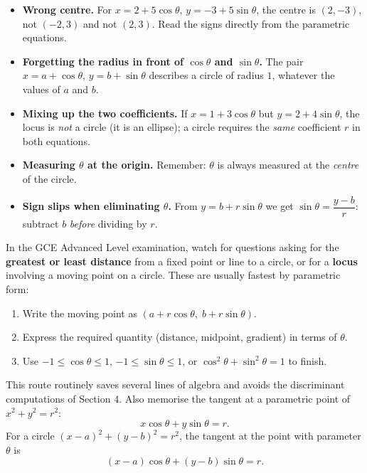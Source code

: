 \documentclass[11pt]{article}
\begin{document}
\begin{attention}
\begin{itemize}
\item \textbf{Wrong centre.} For $x=2+5\cos\theta$, $y=-3+5\sin\theta$, the centre is $(2,-3)$, not $(-2,3)$ and not $(2,3)$. Read the signs directly from the parametric equations.
\item \textbf{Forgetting the radius in front of $\cos\theta$ and $\sin\theta$.} The pair $x=a+\cos\theta$, $y=b+\sin\theta$ describes a circle of radius $1$, whatever the values of $a$ and $b$.
\item \textbf{Mixing up the two coefficients.} If $x=1+3\cos\theta$ but $y=2+4\sin\theta$, the locus is \emph{not} a circle (it is an ellipse); a circle requires the \emph{same} coefficient $r$ in both equations.
\item \textbf{Measuring $\theta$ at the origin.} Remember: $\theta$ is always measured at the \emph{centre} of the circle.
\item \textbf{Sign slips when eliminating $\theta$.} From $y=b+r\sin\theta$ we get $\sin\theta=\dfrac{y-b}{r}$: subtract $b$ \emph{before} dividing by $r$.
\end{itemize}
\end{attention}

\begin{aretenir}
In the GCE Advanced Level examination, watch for questions asking for the \textbf{greatest or least distance} from a fixed point or line to a circle, or for a \textbf{locus} involving a moving point on a circle. These are usually fastest by parametric form:
\begin{enumerate}
\item Write the moving point as $(a+r\cos\theta,\;b+r\sin\theta)$.
\item Express the required quantity (distance, midpoint, gradient) in terms of $\theta$.
\item Use $-1\leq\cos\theta\leq1$, $-1\leq\sin\theta\leq1$, or $\cos^{2}\theta+\sin^{2}\theta=1$ to finish.
\end{enumerate}
This route routinely saves several lines of algebra and avoids the discriminant computations of Section 4. Also memorise the tangent at a parametric point of $x^{2}+y^{2}=r^{2}$:
\[
x\cos\theta+y\sin\theta=r.
\]
For a circle $(x-a)^{2}+(y-b)^{2}=r^{2}$, the tangent at the point with parameter $\theta$ is
\[
(x-a)\cos\theta+(y-b)\sin\theta=r.
\]
\end{aretenir}
\end{document}
